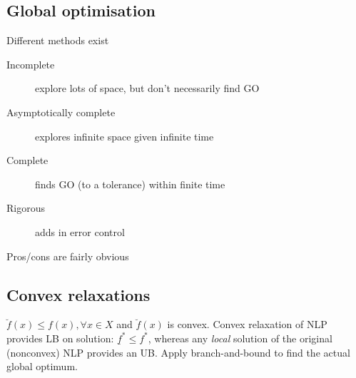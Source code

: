 \documentclass[a4paper,twocolumn,10pt]{article}
\begin{document}
\subsection{Global optimisation}
Different methods exist
\begin{description}
    \item[Incomplete] explore lots of space, but don't necessarily find GO
    \item[Asymptotically complete] explores infinite space given infinite time
    \item[Complete] finds GO (to a tolerance) within finite time
    \item[Rigorous] adds in error control
\end{description}
Pros/cons are fairly obvious
\subsection{Convex relaxations}
$\breve{f}(x) \leq f(x), \forall x \in X$ and $\breve{f}(x)$ is convex.
Convex relaxation of NLP provides LB on solution: $\underline{f}^{*} \leq f^{*}$, whereas any \textit{local} solution of the original (nonconvex) NLP provides an UB.
Apply branch-and-bound to find the actual global optimum.
\end{document}
